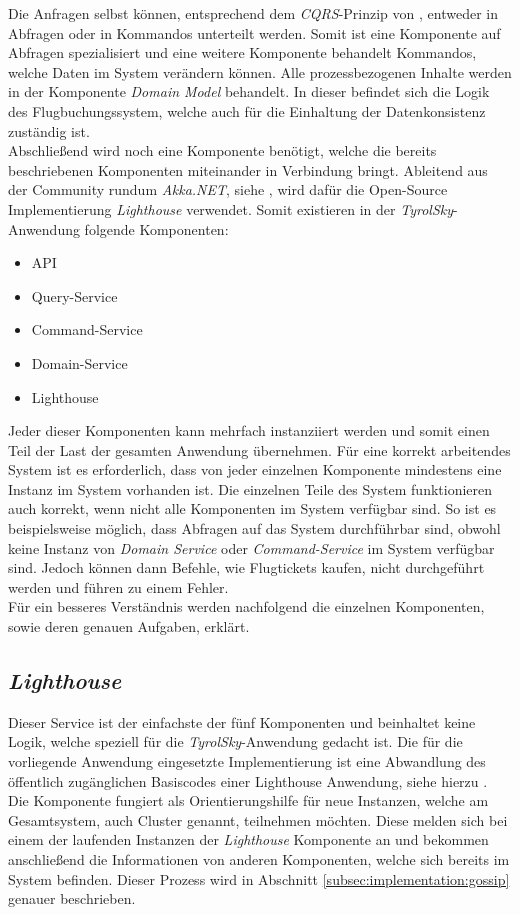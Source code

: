 Die Anfragen selbst können, entsprechend dem \textit{CQRS}-Prinzip von \cite{cqrsYoung2010}, entweder in Abfragen oder in Kommandos unterteilt werden. Somit ist eine Komponente auf Abfragen spezialisiert und eine weitere Komponente behandelt Kommandos, welche Daten im System verändern können. Alle prozessbezogenen Inhalte werden in der Komponente \textit{Domain Model} behandelt. In dieser befindet sich die Logik des Flugbuchungssystem, welche auch für die Einhaltung der Datenkonsistenz zuständig ist. \\
Abschließend wird noch eine Komponente benötigt, welche die bereits beschriebenen Komponenten miteinander in Verbindung bringt. 
Ableitend aus der Community rundum \textit{Akka.NET}, siehe \cite{lighthouse}, wird dafür die Open-Source Implementierung \textit{Lighthouse} verwendet. Somit existieren in der \textit{TyrolSky}-Anwendung folgende Komponenten:
\begin{itemize}
  \item API
  \item Query-Service
  \item Command-Service
  \item Domain-Service
  \item Lighthouse
\end{itemize}
Jeder dieser Komponenten kann mehrfach instanziiert werden und somit einen Teil der Last der gesamten Anwendung übernehmen. Für eine korrekt arbeitendes System ist es erforderlich, dass von jeder einzelnen Komponente mindestens eine Instanz im System vorhanden ist. Die einzelnen Teile des System funktionieren auch korrekt, wenn nicht alle Komponenten im System verfügbar sind. So ist es beispielsweise möglich, dass Abfragen auf das System durchführbar sind, obwohl keine Instanz von \textit{Domain Service} oder \textit{Command-Service} im System verfügbar sind. Jedoch können dann Befehle, wie Flugtickets kaufen, nicht durchgeführt werden und führen zu einem Fehler.\\
Für ein besseres Verständnis werden nachfolgend die einzelnen Komponenten, sowie deren genauen Aufgaben, erklärt.

\subsection{\textit{Lighthouse}}
\label{subsec:implementation:lighthouse}
Dieser Service ist der einfachste der fünf Komponenten und beinhaltet keine Logik, welche speziell für die \textit{TyrolSky}-Anwendung gedacht ist. Die für die vorliegende Anwendung eingesetzte Implementierung ist eine Abwandlung des öffentlich zugänglichen Basiscodes einer Lighthouse Anwendung, siehe hierzu \cite{lighthouse}. \\
Die Komponente fungiert als Orientierungshilfe für neue Instanzen, welche am Gesamtsystem, auch Cluster genannt, teilnehmen möchten. Diese melden sich bei einem der laufenden Instanzen der \textit{Lighthouse} Komponente an und bekommen anschließend die Informationen von anderen Komponenten, welche sich bereits im System befinden. Dieser Prozess wird in Abschnitt \ref{subsec:implementation:gossip} genauer beschrieben.

